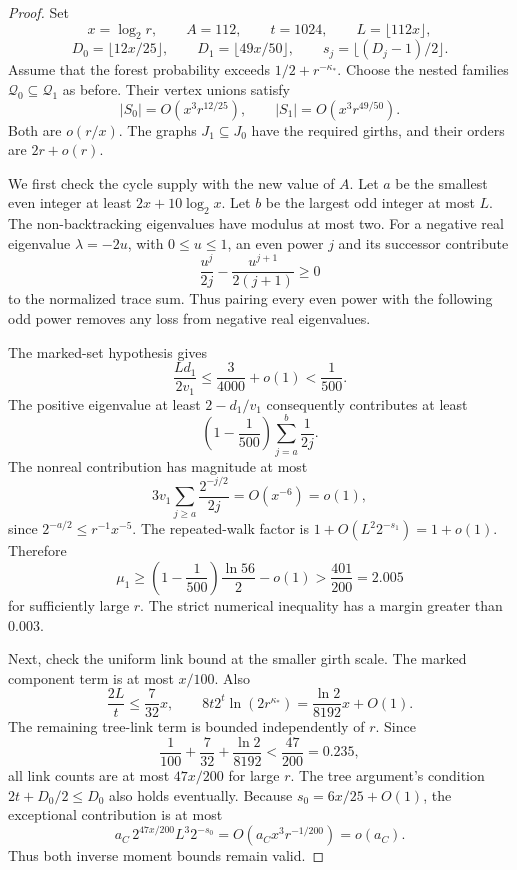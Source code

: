 \begin{proof}
Set
\[
 x=\log_2r,\qquad A=112,\qquad t=1024,\qquad L=\lfloor112x\rfloor,
\]
\[
 D_0=\lfloor12x/25\rfloor,\qquad
 D_1=\lfloor49x/50\rfloor,\qquad
 s_j=\lfloor(D_j-1)/2\rfloor.
\]
Assume that the forest probability exceeds $1/2+r^{-\kappa_*}$.
Choose the nested families $\mathcal Q_0\subseteq\mathcal Q_1$ as before.
Their vertex unions satisfy
\[
 |S_0|=O(x^3r^{12/25}),\qquad
 |S_1|=O(x^3r^{49/50}).
\]
Both are $o(r/x)$.
The graphs $J_1\subseteq J_0$ have the required girths, and their orders are $2r+o(r)$.

We first check the cycle supply with the new value of $A$.
Let $a$ be the smallest even integer at least $2x+10\log_2x$.
Let $b$ be the largest odd integer at most $L$.
The non-backtracking eigenvalues have modulus at most two.
For a negative real eigenvalue $\lambda=-2u$, with $0\le u\le1$, an even power $j$ and its successor contribute
\[
 \frac{u^j}{2j}-\frac{u^{j+1}}{2(j+1)}\ge0
\]
to the normalized trace sum.
Thus pairing every even power with the following odd power removes any loss from negative real eigenvalues.

The marked-set hypothesis gives
\[
 \frac{Ld_1}{2v_1}\le\frac3{4000}+o(1)<\frac1{500}.
\]
The positive eigenvalue at least $2-d_1/v_1$ consequently contributes at least
\[
 \left(1-\frac1{500}\right)\sum_{j=a}^b\frac1{2j}.
\]
The nonreal contribution has magnitude at most
\[
 3v_1\sum_{j\ge a}\frac{2^{-j/2}}{2j}=O(x^{-6})=o(1),
\]
since $2^{-a/2}\le r^{-1}x^{-5}$.
The repeated-walk factor is $1+O(L^2 2^{-s_1})=1+o(1)$.
Therefore
\begin{equation}\label{eq:optimized-initial-mass}
 \mu_1\ge\left(1-\frac1{500}\right)\frac{\ln56}{2}-o(1)
 >\frac{401}{200}=2.005
\end{equation}
for sufficiently large $r$.
The strict numerical inequality has a margin greater than $0.003$.

Next, check the uniform link bound at the smaller girth scale.
The marked component term is at most $x/100$.
Also
\[
 \frac{2L}{t}\le\frac7{32}x,
 \qquad
 8t2^t\ln(2r^{\kappa_*})
 =\frac{\ln2}{8192}x+O(1).
\]
The remaining tree-link term is bounded independently of $r$.
Since
\[
 \frac1{100}+\frac7{32}+\frac{\ln2}{8192}<\frac{47}{200}=0.235,
\]
all link counts are at most $47x/200$ for large $r$.
The tree argument's condition $2t+D_0/2\le D_0$ also holds eventually.
Because $s_0=6x/25+O(1)$, the exceptional contribution is at most
\[
 a_C\,2^{47x/200}L^3 2^{-s_0}
 =O(a_C x^3r^{-1/200})=o(a_C).
\]
Thus both inverse moment bounds remain valid.


\end{proof}
